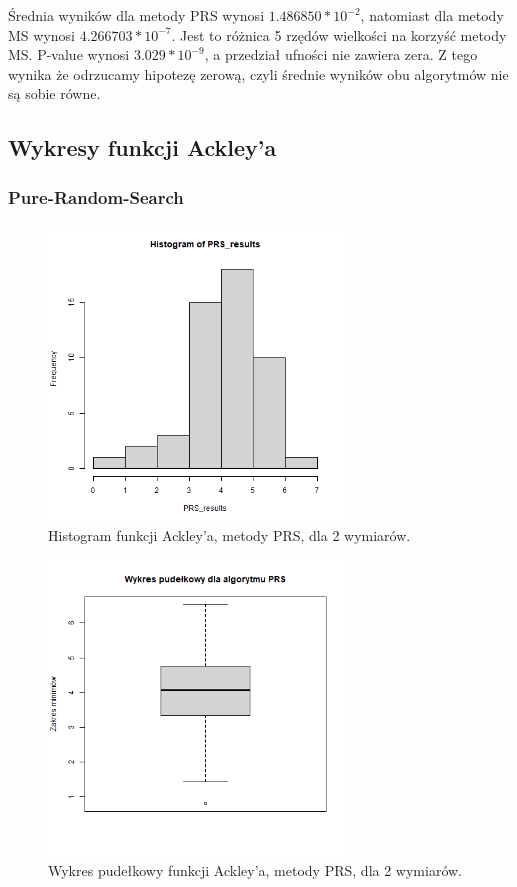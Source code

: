 \documentclass{lab}
\begin{document}
Średnia wyników dla metody PRS wynosi $1.486850*10^{-2}$, natomiast dla metody MS wynosi $4.266703*10^{-7}$. Jest to różnica 5 rzędów wielkości na korzyść metody MS. P-value wynosi $3.029*10^{-9}$, a przedział ufności nie zawiera zera. Z tego wynika że odrzucamy hipotezę zerową, czyli średnie wyników obu algorytmów nie są sobie równe.

\subsection{Wykresy funkcji Ackley’a}
\subsubsection{Pure-Random-Search}
\begin{figure}[H]
  \centering
  \includegraphics[width=0.7\textwidth]{img/dim2_PRS_Ackley_his.png}
  \caption{Histogram funkcji Ackley'a, metody PRS, dla 2 wymiarów.}
\end{figure}
\begin{figure}[H]
  \centering
  \includegraphics[width=0.7\textwidth]{img/dim2_PRS_Ackley.png}
  \caption{Wykres pudełkowy funkcji Ackley'a, metody PRS, dla 2 wymiarów.}
\end{figure}
\end{document}

